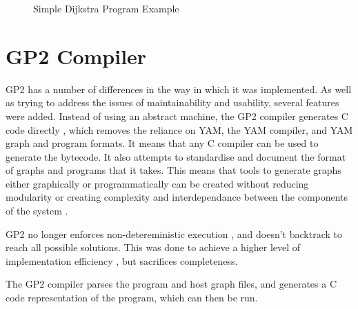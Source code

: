 \documentclass{UoYCSproject}
\begin{document}
\begin{figure}
\caption{Simple Dijkstra Program Example}
\end{figure}

\restoregeometry

\section{GP2 Compiler}
GP2 has a number of differences in the way in which it was implemented. As well as trying to address the issues of maintainability and usability, several features were added. %
Instead of using an abstract machine, the GP2 compiler generates C code directly \cite{chris_compiler}, which removes the reliance on YAM, the YAM compiler, and YAM graph and program formats. It means that any C compiler can be used to generate the bytecode. It also attempts to standardise and document the format of graphs and programs that it takes. This means that tools to generate graphs either graphically or programmatically can be created without reducing modularity or creating complexity and interdependance between the components of the system \cite{gp2_ide}.

GP2 no longer enforces non-detereministic execution \cite[p. 15]{gp2_ide}, and doesn't backtrack to reach all possible solutions. This was done to achieve a higher level of implementation efficiency \cite[p. 15]{chris_compiler}, but sacrifices completeness.

The GP2 compiler parses the program and host graph files, and generates a C code representation of the program, which can then be run.
\end{document}
